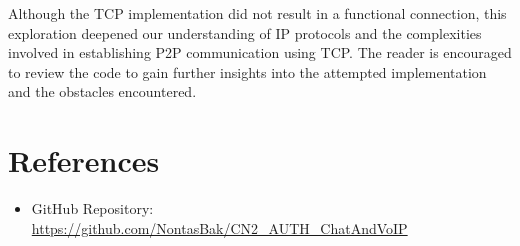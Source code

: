 \documentclass{article}
\begin{document}
Although the TCP implementation did not result in a functional connection, this exploration deepened our understanding of IP protocols and the complexities involved in establishing P2P communication using TCP. The reader is encouraged to review the code to gain further insights into the attempted implementation and the obstacles encountered.


\section{References}
\begin{itemize}
    \item GitHub Repository: \url{https://github.com/NontasBak/CN2_AUTH_ChatAndVoIP}
\end{itemize}
\end{document}
